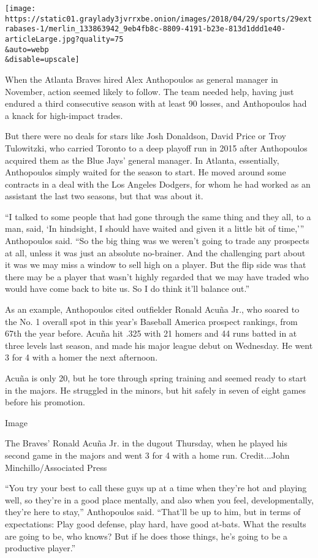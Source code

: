 \texttt{[image: https://static01.graylady3jvrrxbe.onion/images/2018/04/29/sports/29extrabases-1/merlin\_133863942\_9eb4fb8c-8809-4191-b23e-813d1ddd1e40-articleLarge.jpg?quality=75\\\&auto=webp\\\&disable=upscale]}

When the Atlanta Braves hired Alex Anthopoulos as general manager in
November, action seemed likely to follow. The team needed help, having
just endured a third consecutive season with at least 90 losses, and
Anthopoulos had a knack for high-impact trades.

But there were no deals for stars like Josh Donaldson, David Price or
Troy Tulowitzki, who carried Toronto to a deep playoff run in 2015 after
Anthopoulos acquired them as the Blue Jays' general manager. In Atlanta,
essentially, Anthopoulos simply waited for the season to start. He moved
around some contracts in a deal with the Los Angeles Dodgers, for whom
he had worked as an assistant the last two seasons, but that was about
it.

``I talked to some people that had gone through the same thing and they
all, to a man, said, `In hindsight, I should have waited and given it a
little bit of time,''' Anthopoulos said. ``So the big thing was we
weren't going to trade any prospects at all, unless it was just an
absolute no-brainer. And the challenging part about it was we may miss a
window to sell high on a player. But the flip side was that there may be
a player that wasn't highly regarded that we may have traded who would
have come back to bite us. So I do think it'll balance out.''

As an example, Anthopoulos cited outfielder Ronald Acuña Jr., who soared
to the No. 1 overall spot in this year's Baseball America prospect
rankings, from 67th the year before. Acuña hit .325 with 21 homers and
44 runs batted in at three levels last season, and made his major league
debut on Wednesday. He went 3 for 4 with a homer the next afternoon.

Acuña is only 20, but he tore through spring training and seemed ready
to start in the majors. He struggled in the minors, but hit safely in
seven of eight games before his promotion.

Image

The Braves' Ronald Acuña Jr. in the dugout Thursday, when he played his
second game in the majors and went 3 for 4 with a home run.
Credit...John Minchillo/Associated Press

``You try your best to call these guys up at a time when they're hot and
playing well, so they're in a good place mentally, and also when you
feel, developmentally, they're here to stay,'' Anthopoulos said.
``That'll be up to him, but in terms of expectations: Play good defense,
play hard, have good at-bats. What the results are going to be, who
knows? But if he does those things, he's going to be a productive
player.''

